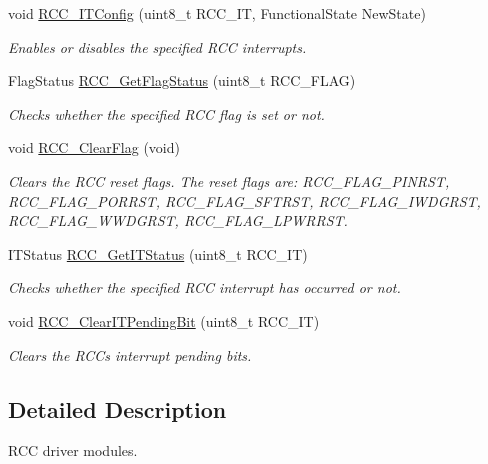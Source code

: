 \begin{DoxyCompactItemize}
void \mbox{\hyperlink{group___r_c_c_gaa953aa226e9ce45300d535941e4dfe2f}{R\+C\+C\+\_\+\+I\+T\+Config}} (uint8\+\_\+t R\+C\+C\+\_\+\+IT, Functional\+State New\+State)
\begin{DoxyCompactList}\small\item\em Enables or disables the specified R\+CC interrupts. \end{DoxyCompactList}\item 
Flag\+Status \mbox{\hyperlink{group___r_c_c_ga2897bdc52f272031c44fb1f72205d295}{R\+C\+C\+\_\+\+Get\+Flag\+Status}} (uint8\+\_\+t R\+C\+C\+\_\+\+F\+L\+AG)
\begin{DoxyCompactList}\small\item\em Checks whether the specified R\+CC flag is set or not. \end{DoxyCompactList}\item 
void \mbox{\hyperlink{group___r_c_c_ga53f909dbb15a54124419084ebda97d72}{R\+C\+C\+\_\+\+Clear\+Flag}} (void)
\begin{DoxyCompactList}\small\item\em Clears the R\+CC reset flags. The reset flags are\+: R\+C\+C\+\_\+\+F\+L\+A\+G\+\_\+\+P\+I\+N\+R\+ST, R\+C\+C\+\_\+\+F\+L\+A\+G\+\_\+\+P\+O\+R\+R\+ST, R\+C\+C\+\_\+\+F\+L\+A\+G\+\_\+\+S\+F\+T\+R\+ST, R\+C\+C\+\_\+\+F\+L\+A\+G\+\_\+\+I\+W\+D\+G\+R\+ST, R\+C\+C\+\_\+\+F\+L\+A\+G\+\_\+\+W\+W\+D\+G\+R\+ST, R\+C\+C\+\_\+\+F\+L\+A\+G\+\_\+\+L\+P\+W\+R\+R\+ST. \end{DoxyCompactList}\item 
I\+T\+Status \mbox{\hyperlink{group___r_c_c_ga6126c99f398ee4be410ad76ae3aee18f}{R\+C\+C\+\_\+\+Get\+I\+T\+Status}} (uint8\+\_\+t R\+C\+C\+\_\+\+IT)
\begin{DoxyCompactList}\small\item\em Checks whether the specified R\+CC interrupt has occurred or not. \end{DoxyCompactList}\item 
void \mbox{\hyperlink{group___r_c_c_ga529842d165910f8f87e26115da36089b}{R\+C\+C\+\_\+\+Clear\+I\+T\+Pending\+Bit}} (uint8\+\_\+t R\+C\+C\+\_\+\+IT)
\begin{DoxyCompactList}\small\item\em Clears the R\+CC\textquotesingle{}s interrupt pending bits. \end{DoxyCompactList}\end{DoxyCompactItemize}


\subsection{Detailed Description}
R\+CC driver modules. 



